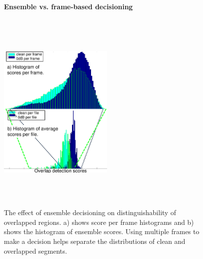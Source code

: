 {\begin{figure}[h!]
	\centering
	\vspace{0mm}
    \textbf{Ensemble vs. frame-based decisioning}\par\medskip	
	\includegraphics[height = 4in, width=0.5\textwidth]{figures/compare_pframe_pfile_hists}
	\vspace{-1mm}
	\caption{The effect of ensemble decisioning on distinguishability of overlapped regions. a) shows score per frame histograms and b) shows the histogram of ensemble scores. Using multiple frames to make a decision helps separate the distributions of clean and overlapped segments.}
	\vspace{-2mm}
	\label{fig:compare_perframe_and_perfile_ovldethist}
\end{figure}



}
